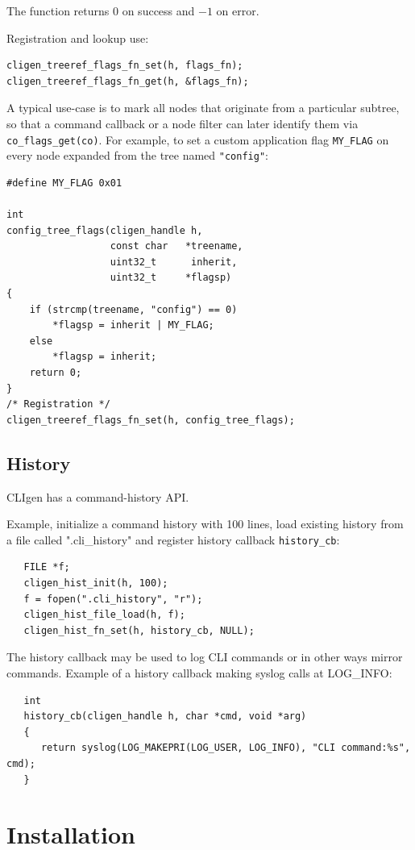 \documentclass[a4paper, 10pt] {article}
\begin{document}
The function returns 0 on success and $-1$ on error.

Registration and lookup use:
\begin{verbatim}
cligen_treeref_flags_fn_set(h, flags_fn);
cligen_treeref_flags_fn_get(h, &flags_fn);
\end{verbatim}

A typical use-case is to mark all nodes that originate from a particular
subtree, so that a command callback or a node filter can later identify them
via {\tt co\_flags\_get(co)}. For example, to set a custom application flag
{\tt MY\_FLAG} on every node expanded from the tree named {\tt "config"}:
\begin{verbatim}
#define MY_FLAG 0x01

int
config_tree_flags(cligen_handle h,
                  const char   *treename,
                  uint32_t      inherit,
                  uint32_t     *flagsp)
{
    if (strcmp(treename, "config") == 0)
        *flagsp = inherit | MY_FLAG;
    else
        *flagsp = inherit;
    return 0;
}
/* Registration */
cligen_treeref_flags_fn_set(h, config_tree_flags);
\end{verbatim}

\subsection{History}

CLIgen has a command-history API.

Example, initialize a command history with 100 lines, load existing history from a file called ".cli\_history" and register history callback {\tt history\_cb}:

\begin{verbatim}
   FILE *f;
   cligen_hist_init(h, 100);
   f = fopen(".cli_history", "r");
   cligen_hist_file_load(h, f);
   cligen_hist_fn_set(h, history_cb, NULL);
\end{verbatim}

The history callback may be used to log CLI commands or in other ways mirror commands. Example of a history callback making syslog calls at LOG\_INFO:

\begin{verbatim}
   int
   history_cb(cligen_handle h, char *cmd, void *arg)
   {
      return syslog(LOG_MAKEPRI(LOG_USER, LOG_INFO), "CLI command:%s", cmd);
   }
\end{verbatim}

\section{Installation}
\end{document}
